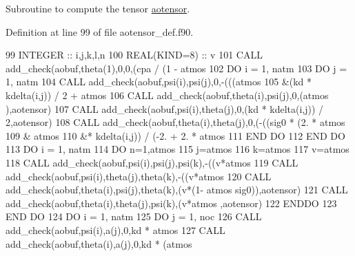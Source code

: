 Subroutine to compute the tensor \hyperlink{namespaceaotensor__def_a0dc43bc9294a18f2fe57b67489f1702f}{aotensor}. 



Definition at line 99 of file aotensor\+\_\+def.\+f90.


\begin{DoxyCode}
99     \textcolor{keywordtype}{INTEGER} :: i,j,k,l,n
100     \textcolor{keywordtype}{REAL(KIND=8)} :: v
101     \textcolor{keyword}{CALL }add\_check(aobuf,theta(1),0,0,(cpa / (1 - atmos%
102     \textcolor{keywordflow}{DO} i = 1, natm
103        \textcolor{keywordflow}{DO} j = 1, natm
104           \textcolor{keyword}{CALL }add\_check(aobuf,psi(i),psi(j),0,-(((atmos%
105                &(kd * kdelta(i,j)) / 2 + atmos%
106           \textcolor{keyword}{CALL }add\_check(aobuf,theta(i),psi(j),0,(atmos%
      ),aotensor)
107           \textcolor{keyword}{CALL }add\_check(aobuf,psi(i),theta(j),0,(kd * kdelta(i,j)) / 2,aotensor)
108           \textcolor{keyword}{CALL }add\_check(aobuf,theta(i),theta(j),0,(-((sig0 * (2. * atmos%
109                & atmos%
110                &* kdelta(i,j)) / (-2. + 2. * atmos%
111 \textcolor{keywordflow}{       END DO}
112 \textcolor{keywordflow}{    END DO}
113     \textcolor{keywordflow}{DO} i = 1, natm
114        \textcolor{keywordflow}{DO} n=1,atmos%
115           j=atmos%
116           k=atmos%
117           v=atmos%
118           \textcolor{keyword}{CALL }add\_check(aobuf,psi(i),psi(j),psi(k),-((v*atmos%
119           \textcolor{keyword}{CALL }add\_check(aobuf,psi(i),theta(j),theta(k),-((v*atmos%
120           \textcolor{keyword}{CALL }add\_check(aobuf,theta(i),psi(j),theta(k),(v*(1- atmos%
      sig0)),aotensor)
121           \textcolor{keyword}{CALL }add\_check(aobuf,theta(i),theta(j),psi(k),(v*atmos%
      ,aotensor)
122 \textcolor{keywordflow}{       ENDDO}
123 \textcolor{keywordflow}{    END DO}
124     \textcolor{keywordflow}{DO} i = 1, natm
125        \textcolor{keywordflow}{DO} j = 1, noc
126           \textcolor{keyword}{CALL }add\_check(aobuf,psi(i),a(j),0,kd * atmos%
127           \textcolor{keyword}{CALL }add\_check(aobuf,theta(i),a(j),0,kd * (atmos%

\end{DoxyCode}
